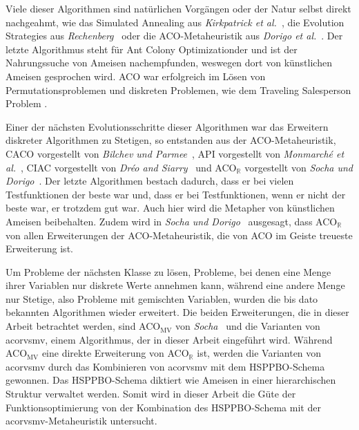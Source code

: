 \documentclass[fontsize=12, a4aper]{scrartcl}
\begin{document}
	Viele dieser Algorithmen sind natürlichen Vorgängen oder der Natur selbst direkt nachgeahmt, wie das Simulated Annealing aus \textit{Kirkpatrick et al.}~\cite{kirkpatrick1983optimization}, die Evolution Strategies aus \textit{Rechenberg}~\cite{rechenberg1973evolutionsstrategie} oder die ACO-Metaheuristik aus \textit{Dorigo et al.}~\cite{dorigo1996ant}. Der letzte Algorithmus steht für Ant Colony Optimizationder und ist der Nahrungssuche von Ameisen nachempfunden, weswegen dort von künstlichen Ameisen gesprochen wird. ACO war erfolgreich im Lösen von Permutationsproblemen und diskreten Problemen, wie dem Traveling Salesperson Problem \cite{stutzle1999aco}.\hfill\newline
	
	Einer der nächsten Evolutionsschritte dieser Algorithmen war das Erweitern diskreter Algorithmen zu Stetigen, so entstanden aus der ACO-Metaheuristik, CACO vorgestellt von \textit{Bilchev und Parmee}~\cite{bilchev1995ant}, API vorgestellt von \textit{Monmarché et al.}~\cite{monmarche2000pachycondyla}, CIAC vorgestellt von \textit{Dréo and Siarry}~\cite{dreo2002new} und ACO\(_\mathbb{R}\) vorgestellt von \textit{Socha und Dorigo}~\cite{socha2008ant}. Der letzte Algorithmen bestach dadurch, dass er bei vielen Testfunktionen der beste war und, dass er bei Testfunktionen, wenn er nicht der beste war, er trotzdem gut war. Auch hier wird die Metapher von künstlichen Ameisen beibehalten. Zudem wird in \textit{Socha und Dorigo}~\cite{socha2008ant} ausgesagt, dass ACO\(_\mathbb{R}\) von allen Erweiterungen der ACO-Metaheuristik, die von ACO im Geiste treueste Erweiterung ist.\hfill\newline
	
	Um Probleme der nächsten Klasse zu lösen, Probleme, bei denen eine Menge ihrer Variablen nur diskrete Werte annehmen kann, während eine andere Menge nur Stetige, also Probleme mit gemischten Variablen, wurden die bis dato bekannten Algorithmen wieder erweitert. Die beiden Erweiterungen, die in dieser Arbeit betrachtet werden, sind ACO\(_\text{MV}\) von \textit{Socha}~\cite{socha2009ant} und die Varianten von \ac{acorvsmv}, einem Algorithmus, der in dieser Arbeit eingeführt wird. Während ACO\(_\text{MV}\) eine direkte Erweiterung von ACO\(_\mathbb{R}\) ist, werden die Varianten von \ac{acorvsmv} durch das Kombinieren von \ac{acorvsmv} mit dem HSPPBO-Schema gewonnen. Das HSPPBO-Schema diktiert wie Ameisen in einer hierarchischen Struktur verwaltet werden. Somit wird in dieser Arbeit die Güte der Funktionsoptimierung von der Kombination des HSPPBO-Schema mit der \ac{acorvsmv}-Metaheuristik untersucht.
	
\end{document}
